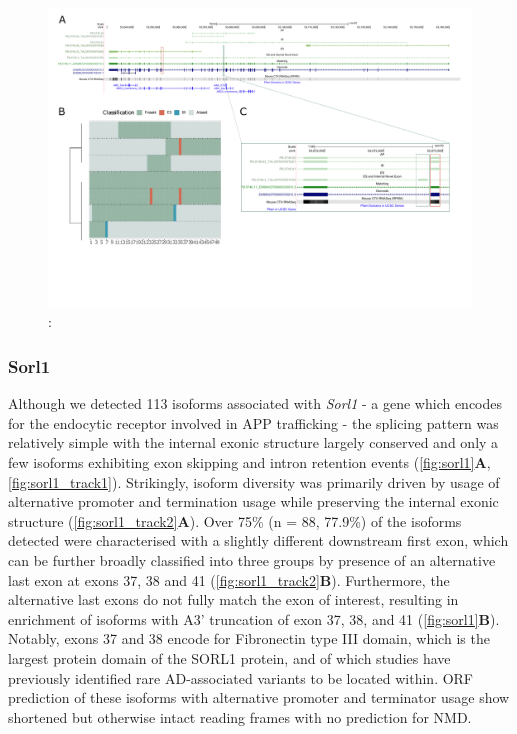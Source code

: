 \begin{landscape}
	\begin{figure}[htp]
		\begin{center}
			\includegraphics[page=5,trim={0 1cm 0 0},scale = 0.85]{Figures/TargetGenes_Annotation_Landscape.pdf}
		\end{center}
		\captionsetup{width=0.95\textwidth}
		\caption[RNA-Seq defined transcriptome]%
		{\textbf{}: }   
		\label{fig:cd33_orf}
	\end{figure}
\end{landscape}    

\subsubsection{Sorl1}
Although we detected 113 isoforms associated with \textit{Sorl1} - a gene which encodes for the endocytic receptor involved in APP trafficking - the splicing pattern was relatively simple with the internal exonic structure largely conserved and only a few isoforms exhibiting exon skipping and intron retention events (\cref{fig:sorl1}\textbf{A}, \cref{fig:sorl1_track1}). Strikingly, isoform diversity was primarily driven by usage of alternative promoter and termination usage while preserving the internal exonic structure (\cref{fig:sorl1_track2}\textbf{A}). Over 75\% (n = 88, 77.9\%) of the isoforms detected were characterised with a slightly different downstream first exon, which can be further broadly classified into three groups by presence of an alternative last exon at exons 37, 38 and 41 (\cref{fig:sorl1_track2}\textbf{B}). Furthermore, the alternative last exons do not fully match the exon of interest, resulting in enrichment of isoforms with A3' truncation of exon 37, 38, and 41 (\cref{fig:sorl1}\textbf{B}). Notably, exons 37 and 38 encode for Fibronectin type III domain, which is the largest protein domain of the SORL1 protein, and of which studies have previously identified rare AD-associated variants to be located within\cite{Verheijen2016}. ORF prediction of these isoforms with alternative promoter and terminator usage show shortened but otherwise intact reading frames with no prediction for NMD. 

